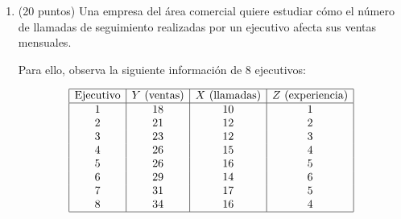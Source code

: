 \documentclass[10pt,a4paper]{article}
\begin{document}
\begin{enumerate}
\begin{enumerate}
        Así, el coeficiente de tratamiento en la regresión simple recogería tanto el efecto de la capacitación como parte del efecto de la motivación.

        \item Si se incorpora la variable motivación \(M\) en la regresión
        \[
        Y_i=\beta_0+\beta_1 T_i+\beta_2 M_i+u_i
        \]
        se esperaría que el coeficiente estimado de \(T\) disminuya.

        La razón es que en la regresión simple el efecto estimado de \(T\) estaba sobrestimado, ya que capturaba:
        \begin{itemize}
            \item el efecto propio de la capacitación;
            \item parte del efecto positivo de la motivación sobre el salario.
        \end{itemize}

        Como la motivación está positivamente correlacionada con el tratamiento y además afecta positivamente al salario, la omisión de \(M\) genera un sesgo positivo en la estimación de \(\beta_1\). Al controlar por motivación, ese sesgo debería reducirse, y por lo tanto el coeficiente de \(T\) debería bajar.


        \item Como pasamos de un $\tilde{\beta_1}=126,67$ a $\hat{\beta_1}=90$ el valor del sesgo esta dado por:
        $$Sesgo = \tilde{\beta_1} - \hat{\beta_1} = 126.67 - 90 = 36.67$$
    \end{enumerate}

    \item (20 puntos) Una empresa del área comercial quiere estudiar cómo el número de llamadas de seguimiento realizadas por un ejecutivo afecta sus ventas mensuales.

    Para ello, observa la siguiente información de 8 ejecutivos:

    \[
    \begin{array}{|c|c|c|c|}
    \hline
    \text{Ejecutivo} & Y \text{ (ventas)} & X \text{ (llamadas)} & Z \text{ (experiencia)}\\
    \hline
    1 & 18 & 10 & 1\\
    2 & 21 & 12 & 2\\
    3 & 23 & 12 & 3\\
    4 & 26 & 15 & 4\\
    5 & 26 & 16 & 5\\
    6 & 29 & 14 & 6\\
    7 & 31 & 17 & 5\\
    8 & 34 & 16 & 4 \\
    \hline
    \end{array}
    \]


\end{enumerate}
\end{document}
